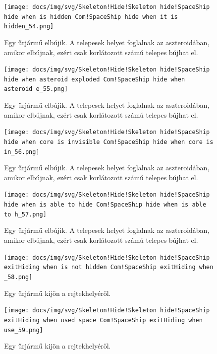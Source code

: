 \begin{figure}[H] 
\centering 
\texttt{[image: docs/img/svg/Skeleton!Hide!Skeleton hide!SpaceShip hide when is hidden Com!SpaceShip hide when it is hidden\_54.png]} 
\caption{Egy űrjármű elbújik. A telepesek helyet foglalnak az aszteroidában, amikor elbújnak, ezért csak korlátozott számú telepes bújhat el.} 
\end{figure} 

\begin{figure}[H] 
\centering 
\texttt{[image: docs/img/svg/Skeleton!Hide!Skeleton hide!SpaceShip hide when asteroid exploded Com!SpaceShip hide when asteroid e\_55.png]} 
\caption{Egy űrjármű elbújik. A telepesek helyet foglalnak az aszteroidában, amikor elbújnak, ezért csak korlátozott számú telepes bújhat el.} 
\end{figure} 

\begin{figure}[H] 
\centering 
\texttt{[image: docs/img/svg/Skeleton!Hide!Skeleton hide!SpaceShip hide when core is invisible Com!SpaceShip hide when core is in\_56.png]} 
\caption{Egy űrjármű elbújik. A telepesek helyet foglalnak az aszteroidában, amikor elbújnak, ezért csak korlátozott számú telepes bújhat el.} 
\end{figure} 

\begin{figure}[H] 
\centering 
\texttt{[image: docs/img/svg/Skeleton!Hide!Skeleton hide!SpaceShip hide when is able to hide Com!SpaceShip hide when is able to h\_57.png]} 
\caption{Egy űrjármű elbújik. A telepesek helyet foglalnak az aszteroidában, amikor elbújnak, ezért csak korlátozott számú telepes bújhat el.} 
\end{figure} 

\begin{figure}[H] 
\centering 
\texttt{[image: docs/img/svg/Skeleton!Hide!Skeleton hide!SpaceShip exitHiding  when is not hidden Com!SpaceShip exitHiding  when \_58.png]} 
\caption{Egy űrjármű kijön a rejtekhelyéről.} 
\end{figure} 

\begin{figure}[H] 
\centering 
\texttt{[image: docs/img/svg/Skeleton!Hide!Skeleton hide!SpaceShip exitHiding  when used space Com!SpaceShip exitHiding  when use\_59.png]} 
\caption{Egy űrjármű kijön a rejtekhelyéről.} 
\end{figure} 

